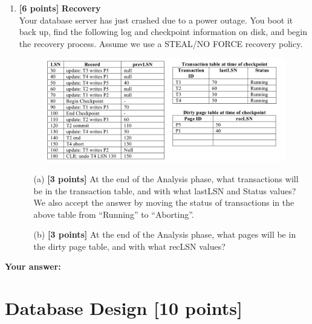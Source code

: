\documentclass[10pt]{article}
\begin{document}
\begin{enumerate}
\newpage
	\item \textbf{[6 points]} \textbf{Recovery} \\
	      Your database server has just crashed due to a power outage.
	      You boot it back up, find the following log and checkpoint information on disk,
	      and begin the recovery process. Assume we use a STEAL/NO FORCE recovery policy.
	      \begin{figure}[h]
		      \centering
		      \includegraphics[width=.8\linewidth]{recovery}
		      \label{fig:recovery}
	      \end{figure}
	      \begin{itemize}
		      \item[(a)] \textbf{[3 points]}
		            At the end of the Analysis phase, what transactions will be in the transaction table,
		            and with what lastLSN and Status values?
		            We also accept the answer by moving the status of transactions in the above table from ``Running'' to ``Aborting''. \\
		      \item[(b)] \textbf{[3 points]}
		            At the end of the Analysis phase, what pages will be in the dirty page table, and with what recLSN values? \\
	      \end{itemize}

\end{enumerate}
\textbf{Your answer:}



\newpage
\section{Database Design \textbf{[10 points]}}
\end{document}
